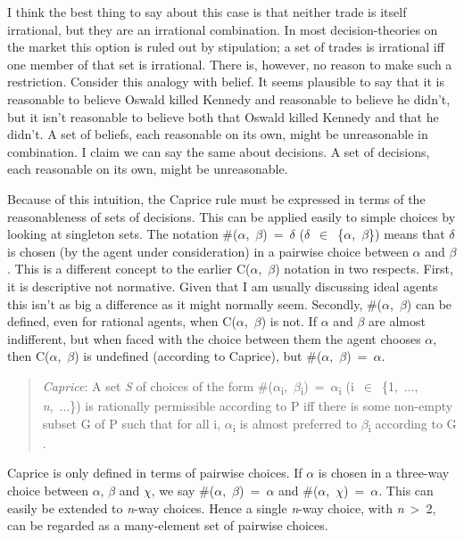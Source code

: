 I think the best thing to say about this case is that neither trade is
itself irrational, but they are an irrational combination. In most
decision-theories on the market this option is ruled out by stipulation;
a set of trades is irrational iff one member of that set is irrational.
There is, however, no reason to make such a restriction. Consider this
analogy with belief. It seems plausible to say that it is reasonable to
believe Oswald killed Kennedy and reasonable to believe he didn't, but
it isn't reasonable to believe both that Oswald killed Kennedy and that
he didn't. A set of beliefs, each reasonable on its own, might be
unreasonable in combination. I claim we can say the same about
decisions. A set of decisions, each reasonable on its own, might be
unreasonable.

Because of this intuition, the Caprice rule must be expressed in terms
of the reasonableness of sets of decisions. This can be applied easily
to simple choices by looking at singleton sets. The notation
\#($\alpha$,~$\beta$)~=~$\delta$ ($\delta$~$\in$~\{$\alpha$,~$\beta$\}) means that $\delta$ is chosen (by the agent under
consideration) in a pairwise choice between $\alpha$ and $\beta$. This is a different
concept to the earlier C($\alpha$,~$\beta$) notation in two respects. First, it is
descriptive not normative. Given that I am usually discussing ideal
agents this isn't as big a difference as it might normally seem.
Secondly, \#($\alpha$,~$\beta$) can be defined, even for rational agents, when
C($\alpha$,~$\beta$) is not. If $\alpha$ and $\beta$ are almost indifferent, but when faced with
the choice between them the agent chooses $\alpha$, then C($\alpha$,~$\beta$) is undefined
(according to Caprice), but \#($\alpha$,~$\beta$)~=~$\alpha$.

\begin{quote}
\emph{Caprice}: A set \emph{S} of choices of the form
\#($\alpha$\textsubscript{i},~$\beta$\textsubscript{i})~=~$\alpha$\textsubscript{i}
(i~$\in$~\{1,~..., \emph{n},~...\}) is rationally permissible according to P
iff there is some non-empty subset G of P such that for all i,
$\alpha$\textsubscript{i} is almost preferred to $\beta$\textsubscript{i} according
to G .
\end{quote}

Caprice is only defined in terms of pairwise choices. If $\alpha$ is chosen in
a three-way choice between $\alpha$, $\beta$ and $\chi$, we say \#($\alpha$,~$\beta$)~=~$\alpha$ and
\#($\alpha$,~$\chi$)~=~$\alpha$. This can easily be extended to \emph{n}-way choices. Hence
a single \emph{n}-way choice, with \emph{n}~\textgreater{}~2, can be
regarded as a many-element set of pairwise choices.

